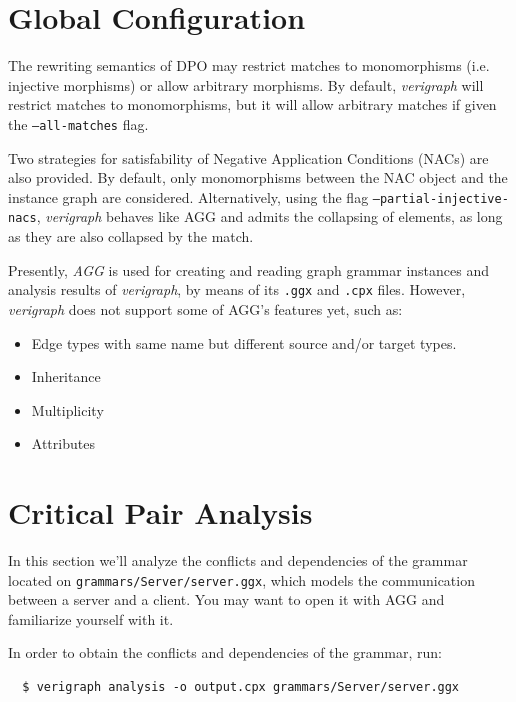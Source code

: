 \documentclass[12pt]{article}
\begin{document}
\pagebreak

\section{Global Configuration}

The rewriting semantics of DPO may restrict matches to monomorphisms (i.e. injective morphisms) or allow arbitrary morphisms. By default, \emph{verigraph} will restrict matches to monomorphisms, but it will allow arbitrary matches if given the \texttt{--all-matches} flag.

Two strategies for satisfability of Negative Application Conditions (NACs) are also provided. By default, only monomorphisms between the NAC object and the instance graph are considered. Alternatively, using the flag \texttt{--partial-injective-nacs}, \emph{verigraph} behaves like AGG and admits the collapsing of elements, as long as they are also collapsed by the match.

Presently, \emph{AGG} is used for creating and reading graph grammar instances and analysis results of \emph{verigraph}, by means of its \texttt{.ggx} and \texttt{.cpx} files. However, \emph{verigraph} does not support some of AGG's features yet, such as:

\begin{itemize}
\item Edge types with same name but different source and/or target types.
\item Inheritance
\item Multiplicity
\item Attributes
\end{itemize}

\pagebreak

\section{Critical Pair Analysis}

In this section we'll analyze the conflicts and dependencies of the grammar located on \texttt{grammars/Server/server.ggx}, which models the communication between a server and a client. You may want to open it with AGG and familiarize yourself with it.

In order to obtain the conflicts and dependencies of the grammar, run:

\begin{verbatim}
  $ verigraph analysis -o output.cpx grammars/Server/server.ggx
\end{verbatim}
\end{document}
